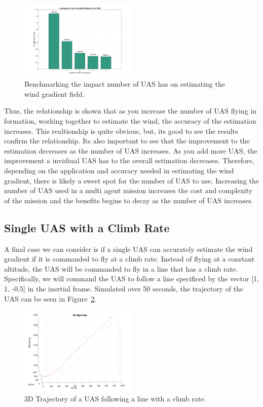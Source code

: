 \begin{figure}[h]
    \centering
    \includegraphics[width=0.5\textwidth]{images/bar_chart.png}
    \caption{Benchmarking the impact number of UAS has on estimating the wind gradient field.}
    \label{fig:benchmark_num_uas}
\end{figure}

Thus, the relationship is shown that as you increase the number of UAS flying in formation, working together to estimate the wind, the accuracy of the estimation increases.
This realtionship is quite obvious, but, its good to see the results confirm the relationship.
Its also important to see that the improvement to the estimation decreases as the number of UAS increases.
As you add more UAS, the improvement a invidiual UAS has to the overall estimation decreases. 
Therefore, depending on the application and accuracy needed in estimating the wind gradient, there is likely a sweet spot for the number of UAS to use.
Increasing the number of UAS used in a multi agent mission increases the cost and complexity of the mission and the benefits begins to decay as the number of UAS increases.


\subsection{Single UAS with a Climb Rate}

A final case we can consider is if a single UAS can accurately estimate the wind gradient if it is commanded to fly at a climb rate.
Instead of flying at a constant altitude, the UAS will be commanded to fly in a line that has a climb rate.
Specifically, we will command the UAS to follow a line specificed by the vector [1, 1, -0.5] in the inertial frame. 
Simulated over 50 seconds, the trajectory of the UAS can be seen in Figure~\ref{fig:uas_traj_one_climb}.

\begin{figure}[h]
    \centering
    \includegraphics[width=0.5\textwidth]{images/3d_climb.png}
    \caption{3D Trajectory of a UAS following a line with a climb rate.}
    \label{fig:uas_traj_one_climb}
\end{figure}

